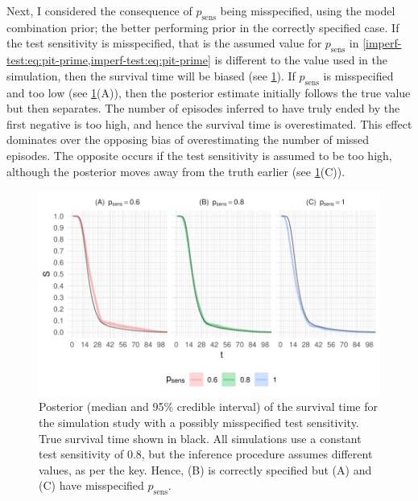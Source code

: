 \documentclass[12pt, letterpaper]{article} %
\newcommand{\psens}{p_\text{sens}}
\begin{document}
Next, I considered the consequence of $\psens$ being misspecified, using the model combination prior; the better performing prior in the correctly specified case.
If the test sensitivity is misspecified, that is the assumed value for $p_\text{sens}$ in \cref{imperf-test:eq:pit-prime,imperf-test:eq:pit-prime} is different to the value used in the simulation, then the survival time will be biased (see \cref{imperf-test:fig:misspecified-test-sensitivity}).
If $\psens$ is misspecified and too low (see \cref{imperf-test:fig:misspecified-test-sensitivity}(A)), then the posterior estimate initially follows the true value but then separates.
The number of episodes inferred to have truly ended by the first negative is too high, and hence the survival time is overestimated.
This effect dominates over the opposing bias of overestimating the number of missed episodes.
The opposite occurs if the test sensitivity is assumed to be too high, although the posterior moves away from the truth earlier (see \cref{imperf-test:fig:misspecified-test-sensitivity}(C)).
\begin{figure}
    \includegraphics[width=\textwidth]{cis-imperfect-testing/sim-misspecified-sensitivity}
  \caption[Simulation study results with misspecified test sensitivity]{%
    Posterior (median and 95\% credible interval) of the survival time for the simulation study with a possibly misspecified test sensitivity.
    True survival time shown in black.
    All simulations use a constant test sensitivity of 0.8, but the inference procedure assumes different values, as per the key.
    Hence, (B) is correctly specified but (A) and (C) have misspecified $\psens$.
  }
  \label{imperf-test:fig:misspecified-test-sensitivity}
\end{figure}
\end{document}
